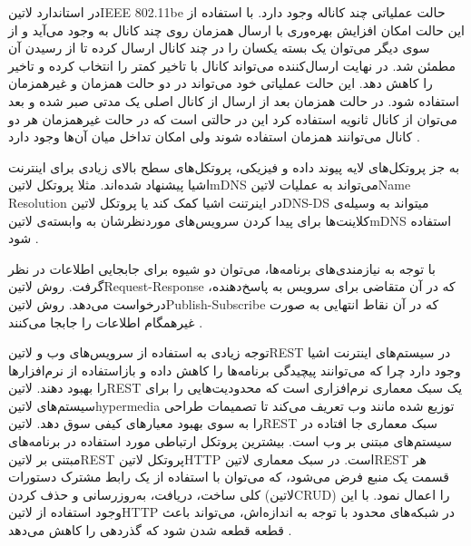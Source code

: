 در استاندارد ‌لاتین{IEEE 802.11be} حالت عملیاتی چند کاناله وجود دارد. با استفاده از این حالت امکان افزایش بهره‌وری با ارسال همزمان
روی چند کانال به وجود می‌آید و از سوی دیگر می‌توان یک بسته یکسان را در چند کانال ارسال کرده تا از رسیدن آن مطمئن شد. در نهایت ارسال‌کننده
می‌تواند کانال با تاخیر کمتر را انتخاب کرده و تاخیر را کاهش دهد. این حالت عملیاتی خود می‌تواند در دو حالت همزمان و غیرهمزمان استفاده شود.
در حالت همزمان بعد از ارسال از کانال اصلی یک مدتی صبر شده و بعد می‌توان از کانال ثانویه استفاده کرد این در حالتی است که در حالت غیرهمزمان
هر دو کانال می‌توانند همزمان استفاده شوند ولی امکان تداخل میان آن‌ها وجود دارد
.



به جز پروتکل‌های لایه پیوند داده و فیزیکی، پروتکل‌های سطح بالای زیادی برای اینترنت اشیا پیشنهاد شده‌اند.
مثلا پروتکل ‌لاتین{mDNS} می‌تواند به عملیات ‌لاتین{Name Resolution} در اینرتنت اشیا کمک کند یا پروتکل
‌لاتین{DNS-DS} میتواند به وسیله‌ی کلاینت‌ها برای پیدا کردن سرویس‌های موردنظرشان به وابسته‌ی ‌لاتین{mDNS} استفاده شود
.

با توجه به نیازمندی‌های برنامه‌ها، می‌توان دو شیوه برای جابجایی اطلاعات در نظر گرفت. روش ‌لاتین{Request-Response}
که در آن متقاضی برای سرویس به پاسخ‌دهنده، درخواست می‌دهد.
روش ‌لاتین{Publish-Subscribe} که در آن نقاط انتهایی به صورت غیرهمگام اطلاعات را جابجا می‌کنند
.

توجه زیادی به استفاده از سرویس‌های وب و ‌لاتین{REST} در سیستم‌های اینترنت اشیا وجود دارد چرا که
می‌توانند پیچیدگی برنامه‌ها را کاهش داده و بازاستفاده از نرم‌افزارها را بهبود دهند.
‌لاتین{REST} یک سبک معماری نرم‌افزاری است که محدودیت‌هایی را برای سیستم‌های ‌لاتین{hypermedia} توزیع شده مانند وب
تعریف می‌کند تا تصمیمات طراحی را به سوی بهبود معیارهای کیفی سوق دهد.
‌لاتین{REST} سبک معماری جا افتاده در سیستم‌های مبتنی بر وب است.
بیشترین پروتکل ارتباطی مورد استفاده در برنامه‌های مبتنی بر ‌لاتین{REST} پروتکل ‌لاتین{HTTP} است.
در سبک معماری ‌لاتین{REST} هر قسمت یک منبع فرض می‌شود، که می‌توان با استفاده از یک رابط مشترک
دستورات کلی ساخت، دریافت، به‌روزرسانی و حذف کردن (‌لاتین{CRUD}) را اعمال نمود.
با این وجود استفاده از ‌لاتین{HTTP} در شبکه‌های محدود با توجه به اندازه‌اش، می‌تواند
باعث قطعه قطعه شدن شود که گذردهی را کاهش می‌دهد
.


